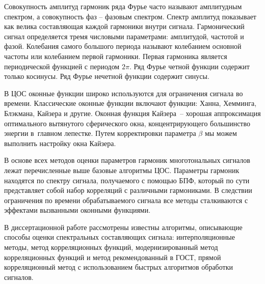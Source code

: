 

Совокупность амплитуд гармоник ряда Фурье часто называют амплитудным спектром, а совокупность фаз -- фазовым спектром. Спектр амплитуд показывает как велика составляющая каждой гармоники внутри сигнала. Гармонический сигнал определяется тремя числовыми параметрами: амплитудой, частотой и фазой. Колебания самого большого периода называют колебанием основной частоты или колебанием первой гармоники. Первая гармоника является периодической функцией с периодом $2 \pi$. Ряд Фурье четной функции содержит только косинусы. Ряд Фурье нечетной функции содержит синусы.

В ЦОС оконные функции широко используются для ограничения сигнала во времени. Классические оконные функции включают функции: Ханна, Хемминга, Блэкмана, Кайзера и другие. Оконная функция Кайзера – хорошая аппроксимация оптимального вытянутого сферического окна, концентрирующего большинство энергии в главном лепестке.
Путем корректировки параметра $\beta$ мы можем выполнить настройку окна
Кайзера.

В основе всех методов оценки параметров гармоник многотональных сигналов лежат перечисленные выше базовые алгоритмы ЦОС. Параметры гармоник находятся по спектру сигнала, получаемого с помощью БПФ, который по сути представляет собой набор корреляций с различными гармониками. В следствии ограничения по времени обрабатываемого сигнала все методы сталкиваются с эффектами вызванными оконными функциями.

В диссертационной работе рассмотрены известны алгоритмы, описывающие способы оценки спектральных составляющих сигнала: интерполяционные методы, метод корреляционных функций, модернизированный метод корреляционных функций и метод рекомендованный в ГОСТ, прямой корреляционный метод с использованием быстрых алгоритмов обработки сигналов. 

